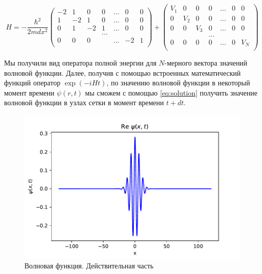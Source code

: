 \documentclass[a4paper, 12pt]{article}
\begin{document}
    \begin{equation}
        H =- \frac{\hbar^2}{2 m dx^2}
        \begin{pmatrix}
        -2 &  1 & 0 & 0     & \dots & 0 & 0 \\
        1  & -2 & 1 & 0     & \dots & 0 & 0 \\
        0  & 1  &-2 & 1     & \dots & 0 & 0 \\
           &    &   & \dots &       &   &   \\
        0  & 0  & 0 &       & \dots &-2 & 1 \\
        \end{pmatrix}
        +
        \begin{pmatrix}
        V_1 &  0  & 0   & 0     & \dots & 0 & 0 \\
        0   & V_2 & 0   & 0     & \dots & 0 & 0 \\
        0   & 0   & V_3 & 0     & \dots & 0 & 0 \\
            &     &     & \dots &       &   &   \\
        0   & 0   & 0   & 0     & \dots & 0 & V_N\\
        \end{pmatrix}        
    \end{equation}

    Мы получили вид оператора полной энергии для $N$-мерного вектора значений волновой функции. Далее, получив с помощью
    встроенных математический функций оператор $\exp(-i H t)$, по значению волновой функции в некоторый момент времени
    $\psi(r, t)$ мы сможем с помощью \eqref{eq:solution} получить значение волновой функции в узлах сетки в момент времени
    $t + dt$. 

    \begin{figure}[h!]
        \centering
        \includegraphics{images/PsiFunctionReal.pdf}
        \caption{Волновая функция. Действительная часть}
        \label{fig:PsiFunctionReal}
    \end{figure}
\end{document}
